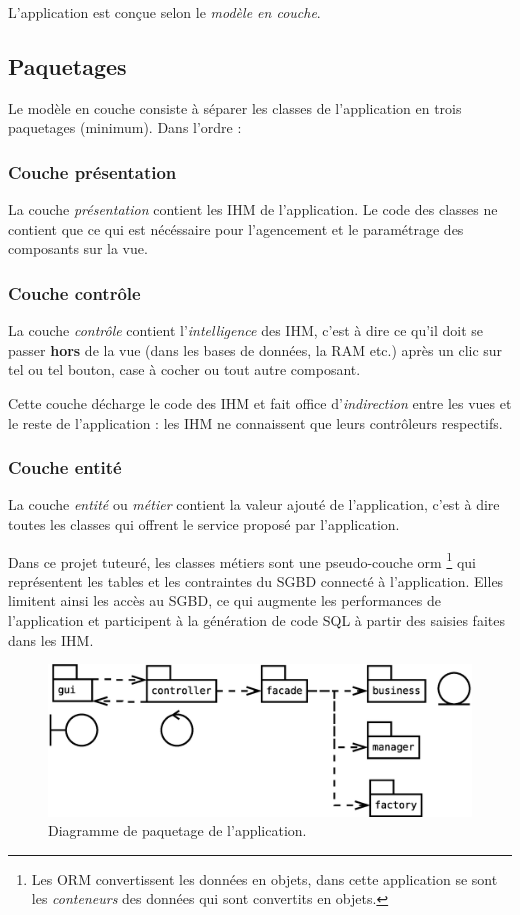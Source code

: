 L'application est conçue selon le \textit{modèle en couche}.

\subsection{Paquetages}
Le modèle en couche consiste à séparer les classes de l'application en trois paquetages (minimum). Dans l'ordre :

\subsubsection{Couche présentation}
La couche \textit{présentation} contient les IHM de l'application. Le code des classes ne contient que ce qui est nécéssaire pour l'agencement et le paramétrage des composants sur la vue.

\subsubsection{Couche contrôle}
La couche \textit{contrôle} contient l'\textit{intelligence} des IHM, c'est à dire ce qu'il doit se passer \textbf{hors} de la vue (dans les bases de données, la RAM etc.) après un clic sur tel ou tel bouton, case à cocher ou tout autre composant.

Cette couche décharge le code des IHM et fait office d'\textit{indirection} entre les vues et le reste de l'application : les IHM ne connaissent que leurs contrôleurs respectifs.

\subsubsection{Couche entité}
La couche \textit{entité} ou \textit{métier} contient la valeur ajouté de l'application, c'est à dire toutes les classes qui offrent le service proposé par l'application.

Dans ce projet tuteuré, les classes métiers sont une pseudo-couche \gls{orm}
\footnote{\label{faux_orm}Les ORM convertissent les données en objets, dans cette application se sont les \textit{conteneurs} des données qui sont convertits en objets.}
qui représentent les tables et les contraintes du SGBD connecté à l'application.
Elles limitent ainsi les accès au SGBD, ce qui augmente les performances de l'application et participent à la génération de code SQL à partir des saisies faites dans les IHM.


\begin{figure}[!h]
  \centering
  \includegraphics[width=14cm]{images/paquetage.eps}
  \caption{Diagramme de paquetage de l'application.}
  \label{diagramme_de_paquetage_idb}
\end{figure}
